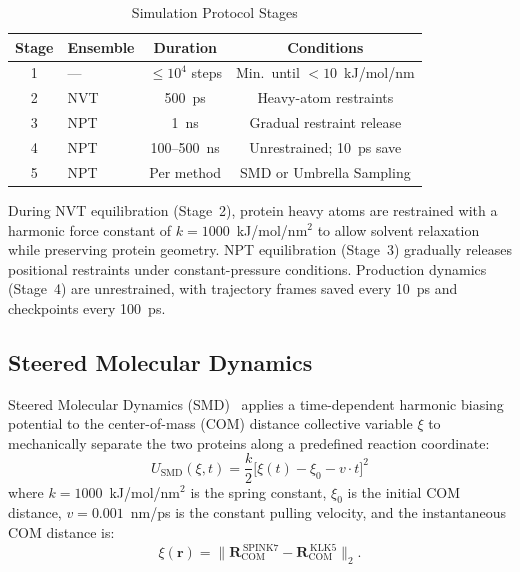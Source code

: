 \documentclass[conference]{IEEEtran}
\begin{document}
\begin{table}[H]
  \centering
  \caption{Simulation Protocol Stages}
  \label{tab:sim_stages}
  \begin{tabular}{@{}clcc@{}}
    \toprule
    \textbf{Stage} & \textbf{Ensemble} & \textbf{Duration} & \textbf{Conditions} \\
    \midrule
    1 & --- & $\leq 10^4$ steps & Min.\ until $< 10$~kJ/mol/nm \\
    2 & NVT & 500~ps & Heavy-atom restraints \\
    3 & NPT & 1~ns & Gradual restraint release \\
    4 & NPT & 100--500~ns & Unrestrained; 10~ps save \\
    5 & NPT & Per method & SMD or Umbrella Sampling \\
    \bottomrule
  \end{tabular}
\end{table}

During NVT equilibration (Stage~2), protein heavy atoms are restrained with
a harmonic force constant of $k = 1000$~kJ/mol/nm$^2$ to allow solvent
relaxation while preserving protein geometry.  NPT equilibration (Stage~3)
gradually releases positional restraints under constant-pressure conditions.
Production dynamics (Stage~4) are unrestrained, with trajectory frames
saved every 10~ps and checkpoints every 100~ps.

\subsection{Steered Molecular Dynamics}\label{sec:smd}

Steered Molecular Dynamics (SMD)~\cite{izrailev1999} applies a
time-dependent harmonic biasing potential to the center-of-mass (COM)
distance collective variable $\xi$ to mechanically separate the two
proteins along a predefined reaction coordinate:
\begin{equation}\label{eq:smd_potential}
  U_{\mathrm{SMD}}(\xi, t) = \frac{k}{2}
    \bigl[\xi(t) - \xi_0 - v \cdot t\bigr]^2
\end{equation}
where $k = 1000$~kJ/mol/nm$^2$ is the spring constant, $\xi_0$ is the
initial COM distance, $v = 0.001$~nm/ps is the constant pulling velocity,
and the instantaneous COM distance is:
\begin{equation}\label{eq:com_dist}
  \xi(\mathbf{r}) = \bigl\|
    \mathbf{R}_{\mathrm{COM}}^{\,\mathrm{SPINK7}}
    - \mathbf{R}_{\mathrm{COM}}^{\,\mathrm{KLK5}}
  \bigr\|_2.
\end{equation}
\end{document}
